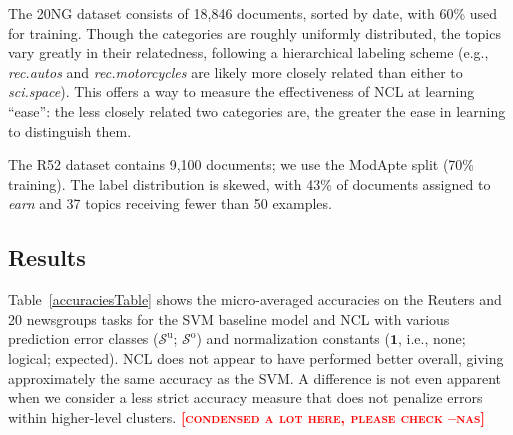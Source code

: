 \documentclass{article} %
\newcommand{\unorderedS}{\mathcal{S}^{\mathrm{u}}}
\newcommand{\orderedS}{\mathcal{S}^{\mathrm{o}}}
\newcommand{\ourmethod}{NCL}
\newcommand{\nascomment}[1]{\textcolor{red}{\textsc{\textbf{[#1 --nas]}}}}
\begin{document}
The 20NG dataset consists of 18,846 documents, sorted by date, with
60\% used for training.  Though the categories are roughly uniformly
distributed, the topics vary greatly in their relatedness, following a
hierarchical labeling scheme (e.g., \emph{rec.autos} and
\emph{rec.motorcycles} are likely more closely related than either to
\emph{sci.space}).  This offers a way to measure the effectiveness of
\ourmethod{} at learning ``ease'':   the less closely related two 
categories are, the greater the ease in learning to distinguish them.

The R52 dataset contains 9,100 documents; we use the ModApte split
(70\% training).  The label distribution is skewed, with 43\% of
documents assigned to \emph{earn} and 37 topics
receiving fewer than 50 examples.


\subsection{Results}

Table~\ref{accuraciesTable} shows the micro-averaged
accuracies on the Reuters and 20 newsgroups tasks for the 
SVM baseline model and \ourmethod{} with
various prediction error classes
($\unorderedS$; $\orderedS$) and normalization constants
($\boldsymbol{1}$, i.e., none; logical; expected).  
\ourmethod{} does not appear to have performed better overall, giving 
approximately the same accuracy as  
the SVM.  A difference is not even apparent when we consider a less
strict accuracy measure that does not penalize errors within
higher-level clusters. \nascomment{condensed a lot here, please check}
\end{document}
